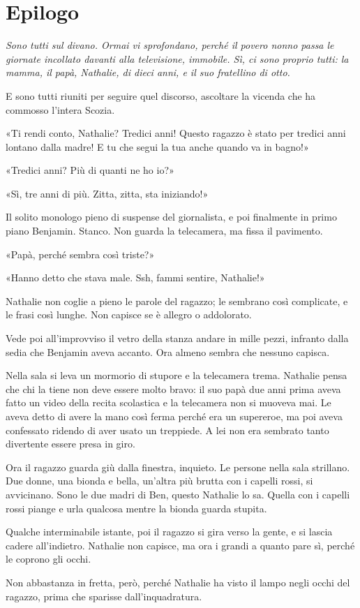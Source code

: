 \chapter{Epilogo}
\label{ch:epilogue}

{\itshape Sono tutti sul divano. Ormai vi sprofondano, perché il povero nonno passa le giornate
incollato davanti alla televisione, immobile. Sì, ci sono proprio tutti: la mamma, il papà,
Nathalie, di dieci anni, e il suo fratellino di otto.

E sono tutti riuniti per seguire quel discorso, ascoltare la vicenda che ha commosso l’intera
Scozia.

«Ti rendi conto, Nathalie? Tredici anni! Questo ragazzo è stato per tredici anni lontano dalla
madre! E tu che segui la tua anche quando va in bagno!»

«Tredici anni? Più di quanti ne ho io?»

«Sì, tre anni di più. Zitta, zitta, sta iniziando!»

Il solito monologo pieno di suspense del giornalista, e poi finalmente in primo piano Benjamin.
Stanco. Non guarda la telecamera, ma fissa il pavimento.

«Papà, perché sembra così triste?»

«Hanno detto che stava male. Ssh, fammi sentire, Nathalie!»

Nathalie non coglie a pieno le parole del ragazzo; le sembrano così complicate, e le frasi così
lunghe. Non capisce se è allegro o addolorato.

Vede poi all’improvviso il vetro della stanza andare in mille pezzi, infranto dalla sedia che
Benjamin aveva accanto. Ora almeno sembra che nessuno capisca.

Nella sala si leva un mormorio di stupore e la telecamera trema. Nathalie pensa che chi la tiene non
deve essere molto bravo: il suo papà due anni prima aveva fatto un video della recita scolastica e
la telecamera non si muoveva mai. Le aveva detto di avere la mano così ferma perché era un
supereroe, ma poi aveva confessato ridendo di aver usato un treppiede. A lei non era sembrato tanto
divertente essere presa in giro.

Ora il ragazzo guarda giù dalla finestra, inquieto. Le persone nella sala strillano. Due donne, una
bionda e bella, un’altra più brutta con i capelli rossi, si avvicinano. Sono le due madri di Ben,
questo Nathalie lo sa. Quella con i capelli rossi piange e urla qualcosa mentre la bionda guarda
stupita.

Qualche interminabile istante, poi il ragazzo si gira verso la gente, e si lascia cadere
all’indietro. Nathalie non capisce, ma ora i grandi a quanto pare sì, perché le coprono gli occhi.

Non abbastanza in fretta, però, perché Nathalie ha visto il lampo negli occhi del ragazzo, prima che
sparisse dall’inquadratura. \/}
